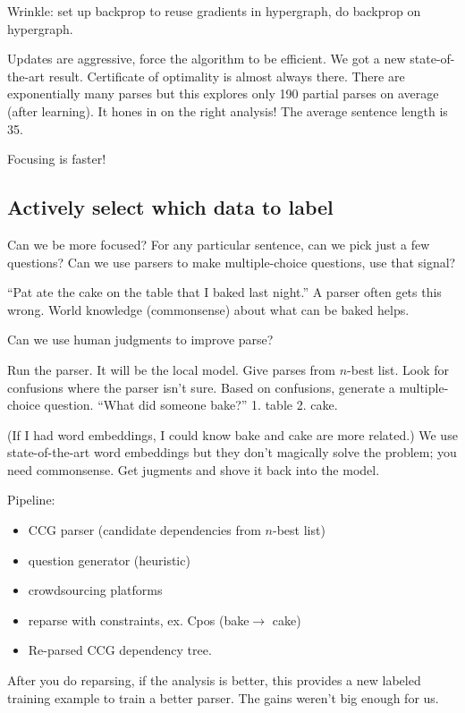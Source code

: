 Wrinkle: set up backprop to reuse gradients in hypergraph, do backprop on hypergraph.

Updates are aggressive, force the algorithm to be efficient. %
We got a new state-of-the-art result.
Certificate of optimality is almost always there.
There are exponentially many parses but this explores only 190 partial parses on average (after learning). It hones in on the right analysis! The average sentence length is 35.

Focusing is faster!

\subsection{Actively select which data to label}

Can we be more focused? For any particular sentence, can we pick just a few questions?  Can we use parsers to make multiple-choice questions, use that signal?

``Pat ate the cake on the table that I baked last night.''
A parser often gets this wrong. World knowledge (commonsense) about what can be baked helps.

Can we use human judgments to improve parse?

Run the parser. It will be the local model. Give parses from $n$-best list. Look for confusions where the parser isn't sure. Based on confusions, generate a multiple-choice question. ``What did someone bake?'' 1. table 2. cake.

(If I had word embeddings, I could know bake and cake are more related.)
We use state-of-the-art word embeddings but they don't magically solve the problem; you need commonsense. Get jugments and shove it back into the model.

Pipeline:
\begin{itemize}
\item
CCG parser (candidate dependencies from $n$-best list)
\item
question generator (heuristic)
\item
crowdsourcing platforms
\item
reparse with constraints, ex. Cpos (bake$\to$ cake)
\item
Re-parsed CCG dependency tree.
\end{itemize}
After you do reparsing, if the analysis is better, this provides a new labeled training example to train a better parser. The gains weren't big enough for us.

